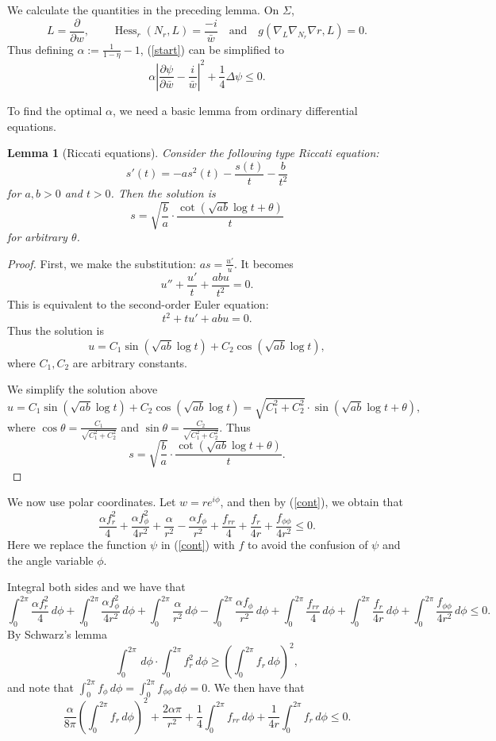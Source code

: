 \documentclass[11pt]{article}
\theoremstyle{plain} \numberwithin{equation}{section}
\newtheorem{lemma}[theorem]{Lemma}
\theoremstyle{definition}
\DeclareMathOperator{\Hessian}{Hess}
\begin{document}
We calculate the quantities in the preceding lemma. On $\Sigma$, 
 \[L=\frac{\partial}{\partial w},\qquad\Hessian_r(N_r, L)=\frac{-i}{\bar{w}}\quad\text{and}\quad g(\nabla_L\nabla_{N_r}\nabla r, L)=0.\] Thus defining $\alpha:=\frac{1}{1-\eta}-1$, (\ref{start}) can be simplified to 
 \begin{equation}\label{cont}
 	\alpha\left|\frac{\partial\psi}{\partial \bar{w}}-\frac{i}{\bar{w}}\right|^2+\frac{1}{4}\Delta\psi\leq 0.
 \end{equation}

To find the optimal $\alpha$, we need a basic lemma from ordinary differential equations.


\begin{lemma}[Riccati equations]\label{riccati}
	Consider the following type Riccati equation: \[s'(t)=-as^2(t)-\frac{s(t)}{t}-\frac{b}{t^2}\] for $a,b>0$ and $t>0$. Then the solution is \[s=\sqrt{\frac{b}{a}}\cdot\frac{\cot(\sqrt{ab}\log t+\theta)}{t}\] for arbitrary $\theta$.
\end{lemma}

\begin{proof}
	First, we make the substitution: $as=\frac{u'}{u}$. It becomes \[u''+\frac{u'}{t}+\frac{abu}{t^2}=0.\]This is equivalent to the second-order Euler equation:\[t^2+tu'+abu=0.\] Thus the solution is \[u=C_1\sin(\sqrt{ab}\log t)+C_2\cos(\sqrt{ab}\log t),\] where $C_1, C_2$ are arbitrary constants. 
	
	We simplify the solution above \[u=C_1\sin(\sqrt{ab}\log t)+C_2\cos(\sqrt{ab}\log t)=\sqrt{C_1^2+C_2^2}\cdot\sin(\sqrt{ab}\log t+\theta),\] where $\cos\theta=\frac{C_1}{\sqrt{C_1^2+C_2^2}}$ and $\sin\theta=\frac{C_2}{\sqrt{C_1^2+C_2^2}}$. Thus \[s=\sqrt{\frac{b}{a}}\cdot\frac{\cot(\sqrt{ab}\log t+\theta)}{t}.\]
\end{proof}


We now use polar coordinates. Let $w=re^{i\phi}$, and then by (\ref{cont}), we obtain that \[\frac{\alpha f_r^2}{4}+\frac{\alpha f_\phi^2}{4r^2}+\frac{\alpha}{r^2}-\frac{\alpha f_\phi}{r^2}+\frac{f_{rr}}{4}+\frac{f_r}{4r}+\frac{f_{\phi\phi}}{4r^2}\leq 0.\] Here we replace the function $\psi$ in (\ref{cont}) with $f$ to avoid the confusion of $\psi$ and the angle variable $\phi$.

Integral both sides and we have that 
\[\int_{0}^{2\pi}\frac{\alpha f_r^2}{4}\, d\phi+\int_{0}^{2\pi}\frac{\alpha f_\phi^2}{4r^2}\, d\phi+\int_{0}^{2\pi}\frac{\alpha}{r^2}\, d\phi-\int_{0}^{2\pi}\frac{\alpha f_\phi}{r^2}\, d\phi+\int_{0}^{2\pi}\frac{f_{rr}}{4}\, d\phi+\int_{0}^{2\pi}\frac{f_r}{4r}\, d\phi+\int_{0}^{2\pi}\frac{f_{\phi\phi}}{4r^2}\, d\phi\leq 0.\]
By Schwarz's lemma
\[\int_{0}^{2\pi}\,d\phi\cdot \int_{0}^{2\pi}f_r^2\,d\phi\geq\left(\int_{0}^{2\pi}f_r\,d\phi\right)^2,\]
and note that $\int_{0}^{2\pi}f_\phi\,d\phi=\int_{0}^{2\pi} f_{\phi\phi}\, d\phi=0$. We then have that 
\[\frac{\alpha}{8\pi}\left(\int_{0}^{2\pi}f_r\, d\phi\right)^2+\frac{2\alpha\pi}{r^2}+\frac{1}{4}\int_{0}^{2\pi}f_{rr}\, d\phi+\frac{1}{4r}\int_{0}^{2\pi}f_r\, d\phi\leq 0.\]
\end{document}
